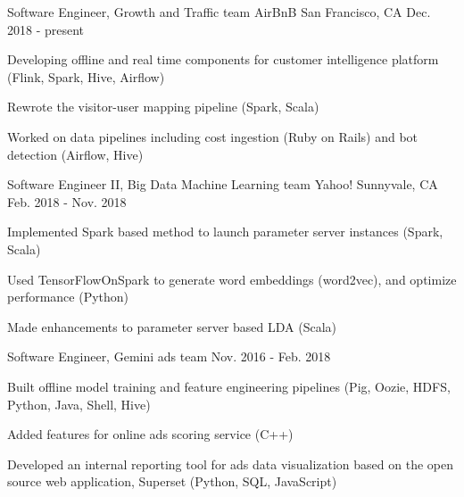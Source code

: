 

\begin{cventries}

  \cventry
    {Software Engineer, Growth and Traffic team} %
    {AirBnB} %
    {San Francisco, CA} %
    {Dec. 2018 - present} %
    {
      \begin{cvitems} %
        \item {Developing offline and real time components for customer intelligence platform (Flink, Spark, Hive, Airflow)}
        \item {Rewrote the visitor-user mapping pipeline (Spark, Scala)}
        \item {Worked on data pipelines including cost ingestion (Ruby on Rails) and bot detection (Airflow, Hive)}
      \end{cvitems}
    }

  \cventry
    {Software Engineer II, Big Data Machine Learning team} %
    {Yahoo!} %
    {Sunnyvale, CA} %
    {Feb. 2018 - Nov. 2018} %
    {
      \begin{cvitems} %
        \item {Implemented Spark based method to launch parameter server instances (Spark, Scala)}
        \item {Used TensorFlowOnSpark to generate word embeddings (word2vec), and optimize performance (Python)}
        \item {Made enhancements to parameter server based LDA (Scala)}
      \end{cvitems}
    }

  \cventry
    {Software Engineer, Gemini ads team} %
    {} %
    {} %
    {Nov. 2016 - Feb. 2018} %
    {
      \begin{cvitems} %
        \item {Built offline model training and feature engineering pipelines (Pig, Oozie, HDFS, Python, Java, Shell, Hive)}
        \item {Added features for online ads scoring service (C++)}
        \item {Developed an internal reporting tool for ads data visualization based on the open source web application,
Superset (Python, SQL, JavaScript)}
      \end{cvitems}
    }
    

\end{cventries}
